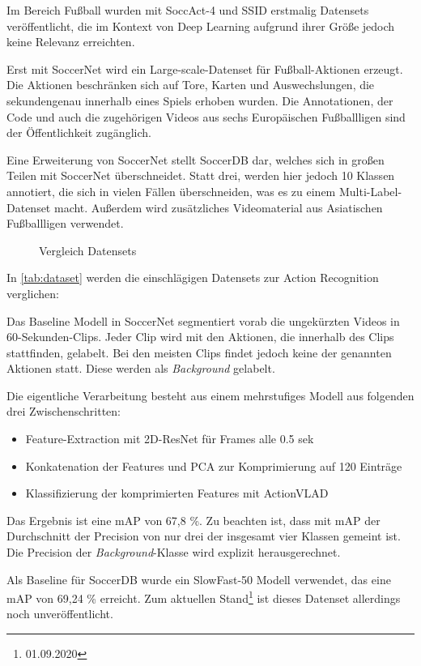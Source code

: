 Im Bereich Fußball wurden mit SoccAct-4 \cite{Ballan09} und SSID \cite{Jiang16} erstmalig Datensets veröffentlicht, die im Kontext von Deep Learning aufgrund ihrer Größe jedoch keine Relevanz erreichten.

Erst mit SoccerNet \cite{Giancola18} wird ein Large-scale-Datenset für Fußball-Aktionen erzeugt.
Die Aktionen beschränken sich auf Tore, Karten und Auswechslungen, die sekundengenau innerhalb eines Spiels erhoben wurden.
Die Annotationen, der Code und auch die zugehörigen Videos aus sechs Europäischen Fußballligen sind der Öffentlichkeit zugänglich.

Eine Erweiterung von SoccerNet stellt SoccerDB \cite{Jiang19} dar, welches sich in großen Teilen mit SoccerNet überschneidet.
Statt drei, werden hier jedoch 10 Klassen annotiert, die sich in vielen Fällen überschneiden, was es zu einem Multi-Label-Datenset macht.
Außerdem wird zusätzliches Videomaterial aus Asiatischen Fußballligen verwendet.

\begin{figure}
    \centering
    \caption[Vergleich Datensets]{Vergleich Datensets}
    \label{tab:dataset}
\end{figure}

In \autoref{tab:dataset} werden die einschlägigen Datensets zur Action Recognition verglichen:

Das Baseline Modell in SoccerNet segmentiert vorab die ungekürzten Videos in 60-Sekunden-Clips.
Jeder Clip wird mit den Aktionen, die innerhalb des Clips stattfinden, gelabelt.
Bei den meisten Clips findet jedoch keine der genannten Aktionen statt.
Diese werden als \emph{Background} gelabelt.

Die eigentliche Verarbeitung besteht aus einem mehrstufiges Modell aus folgenden drei Zwischenschritten:

\begin{itemize}
    \item Feature-Extraction mit 2D-ResNet für Frames alle 0.5 sek
    \item Konkatenation der Features und PCA zur Komprimierung auf 120 Einträge
    \item Klassifizierung der komprimierten Features mit ActionVLAD
\end{itemize}

Das Ergebnis ist eine mAP von 67,8 \%.
Zu beachten ist, dass mit mAP der Durchschnitt der Precision von nur drei der insgesamt vier Klassen gemeint ist.
Die Precision der \emph{Background}-Klasse wird explizit herausgerechnet.

Als Baseline für SoccerDB wurde ein SlowFast-50 Modell verwendet, das eine mAP von 69,24 \% erreicht.
Zum aktuellen Stand\footnote{01.09.2020} ist dieses Datenset allerdings noch unveröffentlicht.

